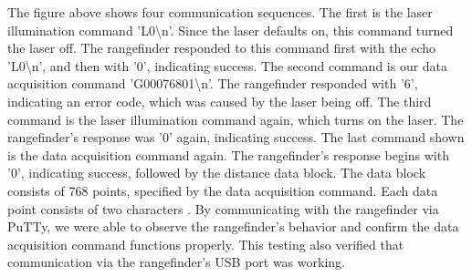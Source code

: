 The figure above shows four communication sequences. The first is the laser illumination command 'L0\textbackslash{}n'. Since the laser defaults on, this command turned the laser off. The rangefinder responded to this command first with the echo 'L0\textbackslash{}n', and then with '0', indicating success. The second command is our data acquisition command 'G00076801\textbackslash{}n'. The rangefinder responded with '6', indicating an error code, which was caused by the laser being off. The third command is the laser illumination command again, which turns on the laser. The rangefinder's response was '0' again, indicating success. The last command shown is the data acquisition command again. The rangefinder's response begins with '0', indicating success, followed by the distance data block. The data block consists of 768 points, specified by the data acquisition command. Each data point consists of two characters \cite{urg04lx_datasheet}. By communicating with the rangefinder via PuTTy, we were able to observe the rangefinder's behavior and confirm the data acquisition command functions properly. This testing also verified that communication via the rangefinder's USB port was working.


